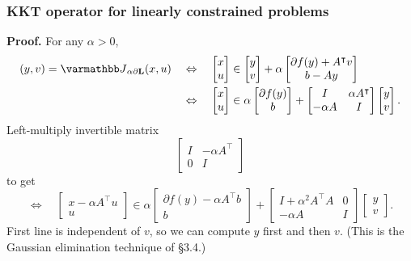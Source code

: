 \documentclass[10pt,mathserif]{beamer}
\begin{document}
\begin{frame}
\frametitle{KKT operator for linearly constrained problems}
\textbf{Proof.}
For any $\alpha>0$,
\begin{align*}
(y,v)=\opJ_{\alpha \partial \lagrange}(x,u )
\quad&\Leftrightarrow\quad
\begin{bmatrix}
x\\u
\end{bmatrix}
\in
\begin{bmatrix}
y\\v
\end{bmatrix}
+
\alpha
\begin{bmatrix}
\partial f(y)+A^\intercal v\\
b-Ay
\end{bmatrix}\\
\quad&\Leftrightarrow\quad
\begin{bmatrix}
x\\u
\end{bmatrix}
\in
\alpha
\begin{bmatrix}
 \partial f(y)\\
b
\end{bmatrix}
+
\begin{bmatrix}
I&\alpha A^\intercal\\
-\alpha A &I
\end{bmatrix}
\begin{bmatrix}
y\\v
\end{bmatrix}.
\end{align*}
Left-multiply invertible matrix
\[
\begin{bmatrix}
I&-\alpha A^\intercal\\
0&I
\end{bmatrix}
\]
to get
\[
\Leftrightarrow\quad
\begin{bmatrix}
x-\alpha A^\intercal u\\u
\end{bmatrix}
\in
\alpha
\begin{bmatrix}
 \partial f(y)-\alpha A^\intercal b\\
b
\end{bmatrix}
+
\begin{bmatrix}
I+\alpha^2A^\intercal A&0\\
-\alpha A &I
\end{bmatrix}
\begin{bmatrix}
y\\v
\end{bmatrix}.
\]
First line is independent of $v$, so we can compute $y$ first and then $v$.
(This is the Gaussian elimination technique of \S3.4.)
\end{frame}
\end{document}
